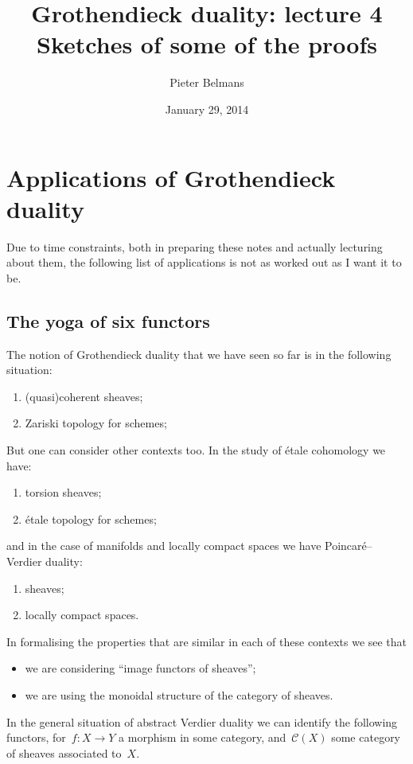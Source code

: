 \documentclass[10pt,a4paper]{article}
\title{Grothendieck duality: lecture 4 \\[.2em] \Large Sketches of some of the proofs}
\author{Pieter Belmans}
\date{January 29, 2014}
\begin{document}
\maketitle

\begin{abstract}
  
\end{abstract}

\tableofcontents

\clearpage

\section{Applications of Grothendieck duality}
\label{section:applications-grothendieck-duality}
Due to time constraints, both in preparing these notes and actually lecturing about them, the following list of applications is not as worked out as I want it to be.

\subsection{The yoga of six functors}
\label{subsection:six-functors-yoga}
The notion of Grothendieck duality that we have seen so far is in the following situation:
\begin{enumerate}
  \item (quasi)coherent sheaves;
  \item Zariski topology for schemes;
\end{enumerate}
But one can consider other contexts too. In the study of \'etale cohomology we have:
\begin{enumerate}
  \item torsion sheaves;
  \item \'etale topology for schemes;
\end{enumerate}
and in the case of manifolds and locally compact spaces we have Poincar\'e--Verdier duality:
\begin{enumerate}
  \item sheaves;
  \item locally compact spaces.
\end{enumerate}

In formalising the properties that are similar in each of these contexts we see that
\begin{itemize}
  \item we are considering ``image functors of sheaves'';
  \item we are using the monoidal structure of the category of sheaves.
\end{itemize}
In the general situation of abstract Verdier duality we can identify the following functors, for~$f\colon X\to Y$ a morphism in some category, and~$\mathcal{C}(X)$ some category of sheaves associated to~$X$.
\end{document}
